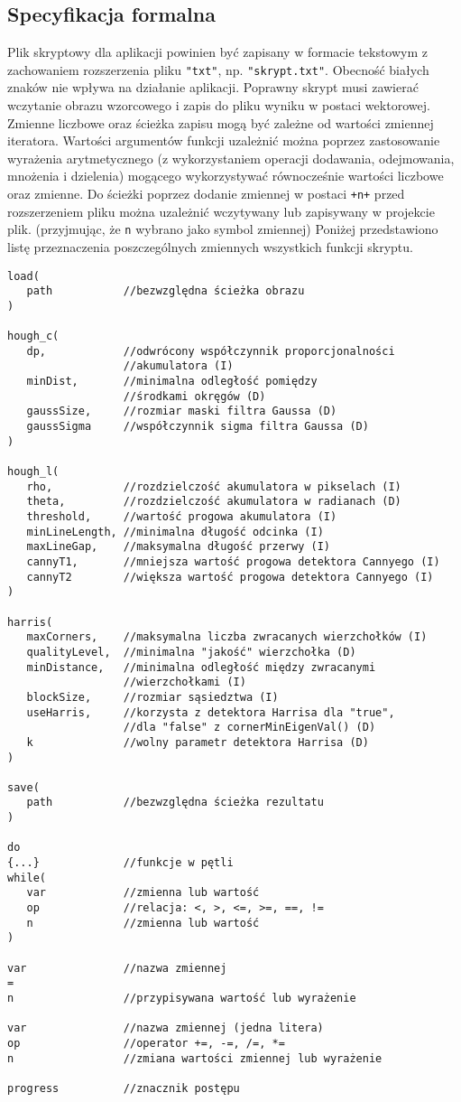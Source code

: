 \documentclass[11pt,a4paper]{article}
\begin{document}
\subsection{Specyfikacja formalna}\label{zmienne}
Plik skryptowy dla aplikacji powinien być zapisany w formacie tekstowym z zachowaniem rozszerzenia pliku {\tt "txt"}, np. {\tt "skrypt.txt"}. Obecność białych znaków nie wpływa na działanie aplikacji. Poprawny skrypt musi zawierać wczytanie obrazu wzorcowego i zapis do pliku wyniku w postaci wektorowej. Zmienne liczbowe oraz ścieżka zapisu mogą być zależne od wartości zmiennej iteratora. Wartości argumentów funkcji uzależnić można poprzez zastosowanie wyrażenia arytmetycznego (z wykorzystaniem operacji dodawania, odejmowania, mnożenia i dzielenia) mogącego wykorzystywać równocześnie wartości liczbowe oraz zmienne. Do ścieżki poprzez dodanie zmiennej w postaci {\tt +n+} przed rozszerzeniem pliku można uzależnić wczytywany lub zapisywany w projekcie plik. (przyjmując, że {\tt n} wybrano jako symbol zmiennej) Poniżej przedstawiono listę przeznaczenia poszczególnych zmiennych wszystkich funkcji skryptu.
\begin{verbatim}
load(
   path           //bezwzględna ścieżka obrazu
)

hough_c(
   dp,            //odwrócony współczynnik proporcjonalności
                  //akumulatora (I)
   minDist,       //minimalna odległość pomiędzy
                  //środkami okręgów (D)
   gaussSize,     //rozmiar maski filtra Gaussa (D)
   gaussSigma     //współczynnik sigma filtra Gaussa (D)
)

hough_l(
   rho,           //rozdzielczość akumulatora w pikselach (I)
   theta,         //rozdzielczość akumulatora w radianach (D)
   threshold,     //wartość progowa akumulatora (I)
   minLineLength, //minimalna długość odcinka (I)
   maxLineGap,    //maksymalna długość przerwy (I)
   cannyT1,       //mniejsza wartość progowa detektora Cannyego (I)
   cannyT2        //większa wartość progowa detektora Cannyego (I)
)

harris(
   maxCorners,    //maksymalna liczba zwracanych wierzchołków (I)
   qualityLevel,  //minimalna "jakość" wierzchołka (D)
   minDistance,   //minimalna odległość między zwracanymi
                  //wierzchołkami (I)
   blockSize,     //rozmiar sąsiedztwa (I)
   useHarris,     //korzysta z detektora Harrisa dla "true",
                  //dla "false" z cornerMinEigenVal() (D)
   k              //wolny parametr detektora Harrisa (D)
)

save(
   path           //bezwzględna ścieżka rezultatu
)

do
{...}             //funkcje w pętli
while(
   var            //zmienna lub wartość
   op             //relacja: <, >, <=, >=, ==, !=
   n              //zmienna lub wartość
)

var               //nazwa zmiennej
=
n                 //przypisywana wartość lub wyrażenie
              
var               //nazwa zmiennej (jedna litera)
op                //operator +=, -=, /=, *=
n                 //zmiana wartości zmiennej lub wyrażenie

progress          //znacznik postępu
\end{verbatim}
\end{document}
